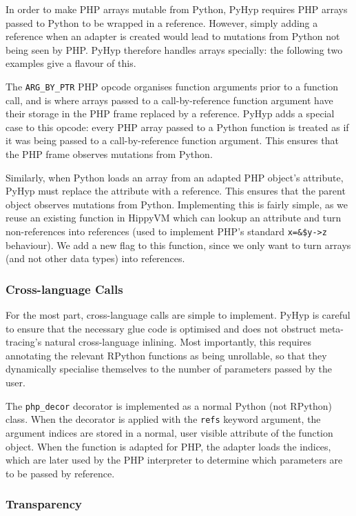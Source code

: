 \documentclass[a4paper,UKenglish]{lipics-v2016}
\newcommand{\ourvm}{PyHyp\xspace}
\newcommand{\hippy}{HippyVM\xspace}
\begin{document}
In order to make PHP arrays mutable from Python, \ourvm requires
PHP arrays passed to Python to be wrapped in a reference. However,
simply adding a reference when an adapter is created would lead to mutations from
Python not being seen by PHP. \ourvm therefore handles arrays specially:
the following two examples give a flavour of this.

The \texttt{ARG\_BY\_PTR} PHP opcode organises function arguments prior to a
function call, and is where arrays passed to a call-by-reference function
argument have their storage in the PHP frame replaced by a reference. \ourvm
adds a special case to this opcode: every PHP array passed to a Python function
is treated as if it was being passed to a call-by-reference function argument. This
ensures that the PHP frame observes mutations from Python.

Similarly, when Python loads an array from an adapted PHP object's attribute, \ourvm
must replace the attribute with a reference. This ensures that
the parent object observes mutations from Python. Implementing this is fairly
simple, as we reuse an existing function in \hippy
which can lookup an attribute and turn non-references into references (used to
implement PHP's standard \texttt{x=\&\$y->z} behaviour). We add a new flag to
this function, since we only want to turn arrays (and not other data types) into
references.


\subsubsection{Cross-language Calls}

For the most part, cross-language calls are simple to implement. \ourvm is
careful to ensure that the necessary glue code is optimised and does not
obstruct meta-tracing's natural cross-language inlining. Most importantly,
this requires annotating the relevant RPython functions as being unrollable,
so that they dynamically specialise themselves to the number of
parameters passed by the user.

The \texttt{php\_decor} decorator is implemented as a normal Python (not
RPython) class. When the decorator is applied with the \texttt{refs} keyword
argument, the argument indices are stored in a normal, user visible attribute of the function
object. When the function is adapted for PHP, the adapter loads the
indices, which are later used by the PHP interpreter to determine which parameters are
to be passed by reference.


\subsubsection{Transparency}
\end{document}
